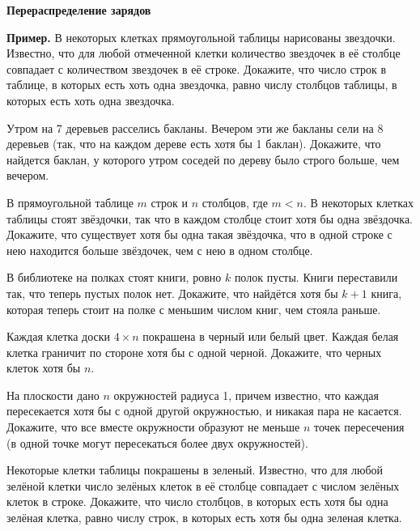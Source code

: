 \documentclass{article}
\begin{document}
    \large

    \begin{center}
        \textbf{Перераспределение зарядов}
    \end{center}

    \textbf{Пример.} В некоторых клетках прямоугольной таблицы нарисованы звездочки.
    Известно, что для любой отмеченной клетки количество звездочек в её столбце совпадает с количеством звездочек в её строке.
    Докажите, что число строк в таблице, в которых есть хоть одна звездочка, равно числу столбцов таблицы, в которых есть хоть одна звездочка.

    \begin{enumerate_boxed}
        \item Утром на 7 деревьев расселись бакланы.
        Вечером эти же бакланы сели на 8 деревьев (так, что на каждом дереве есть хотя бы 1 баклан).
        Докажите, что найдется баклан, у которого утром соседей по дереву было строго больше, чем вечером.

        \item В прямоугольной таблице $ m $ строк и $ n $ столбцов, где $ m < n $.
        В некоторых клетках таблицы стоят звёздочки, так что в каждом столбце стоит хотя бы одна звёздочка.
        Докажите, что существует хотя бы одна такая звёздочка, что в одной строке с нею находится больше звёздочек, чем с нею в одном столбце.

        \item В библиотеке на полках стоят книги, ровно $ k $ полок пусты.
        Книги переставили так, что теперь пустых полок нет.
        Докажите, что найдётся хотя бы $ k + 1 $ книга, которая теперь стоит на полке с меньшим числом книг, чем стояла раньше.

        \item Каждая клетка доски $ 4 \times n $ покрашена в черный или белый цвет.
        Каждая белая клетка граничит по стороне хотя бы с одной черной.
        Докажите, что черных клеток хотя бы $ n $.

        \item На плоскости дано $ n $ окружностей радиуса 1, причем известно, что каждая пересекается хотя бы с одной другой окружностью, и никакая пара не касается.
        Докажите, что все вместе окружности образуют не меньше $ n $ точек пересечения (в одной точке могут пересекаться более двух окружностей).

        \item Некоторые клетки таблицы покрашены в зеленый.
        Известно, что для любой зелёной клетки число зелёных клеток в её столбце совпадает с числом зелёных клеток в строке.
        Докажите, что число столбцов, в которых есть хотя бы одна зелёная клетка, равно числу строк, в которых есть хотя бы одна зеленая клетка.


\end{enumerate_boxed}
\end{document}
